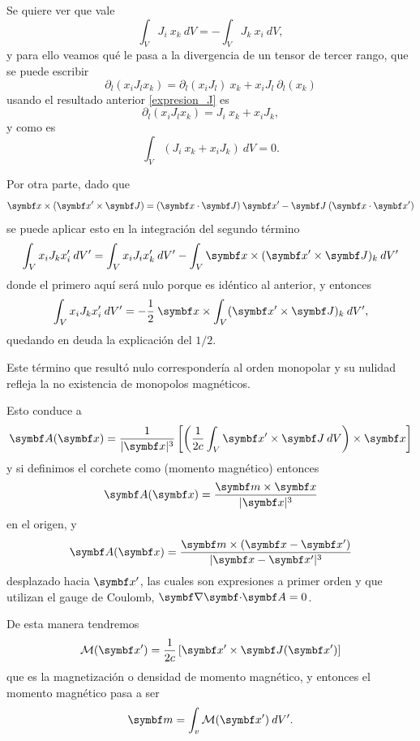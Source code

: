 \documentclass[10pt,oneside]{CBFT_book}
\begin{document}
Se quiere ver que vale 
\[
	\int_V J_i \: x_k \: dV = - \int_V J_k \: x_i \: dV,
\]
y para ello veamos qué le pasa a la divergencia de un tensor de tercer rango, que se puede
escribir
\[
	\partial_l( x_i J_l x_k ) =  \partial_l( x_i J_l ) \: x_k + x_i J_l \:\partial_l( x_k )
\]
usando el resultado anterior \eqref{expresion_J} es
\[
	\partial_l( x_i J_l x_k ) = J_i \: x_k + x_i J_k,
\]
y como es
\[
	\int_V (J_i \: x_k + x_i J_k ) \: dV = 0.
\]

Por otra parte, dado que 
\[
	\vbx \times ( \vbx'\times \vb{J}) = (\pe{x}{J})\: \vbx'- \vb{J} \: (\pe{x}{x'} )
\]
se puede aplicar esto en la integración del segundo término
\[
	\int_V x_i J_k x_i' \: dV' = \int_V x_i J_i x_k' \: dV' - \int_V \vbx \times ( \vbx' \times \vb{J} )_k \: dV'
\]
donde el primero aquí será nulo porque es idéntico al anterior, y entonces
\[
	\int_V x_i J_k x_i' \: dV' = - \frac{1}{2} \: \vbx \times \int_V  ( \vbx' \times \vb{J} )_k \: dV',
\]
quedando en deuda la explicación del $1/2$.


Este término que resultó nulo correspondería al orden monopolar y su nulidad refleja la no existencia 
de monopolos magnéticos.

Esto conduce a 
\[
	\vb{A}(\vb{x}) = \frac{1}{|\vb{x}|^3} 
	\left[ \left(\frac{1}{2c} \int_V \vb{x}'\times \vb{J} \: dV \right) \times \vb{x} \right] 
\]
y si definimos el corchete como  (momento magnético) entonces
\[
	\vb{A}(\vb{x}) = \frac{\vb{m} \times \vb{x} }{|\vb{x}|^3}
\]
en el origen, y 
\[
	\vb{A}(\vb{x}) = \frac{\vb{m} \times (\vb{x}-\vb{x}') }{|\vb{x}-\vb{x}'|^3}
\]
desplazado hacia $\vb{x}'$, las cuales son expresiones a primer orden y que utilizan el gauge de Coulomb, 
$\divem{A}=0$.

De esta manera tendremos
\[
	\mathcal{M}(\vb{x}') = \frac{1}{2c} \left[ \vb{x}' \times \vb{J}(\vb{x}')\right]
\]
que es la magnetización o densidad de momento magnético, y entonces el momento magnético pasa a ser 
\[
	\vb{m} = \int_v \mathcal{M}(\vb{x}') \:dV'.
\]
\end{document}
